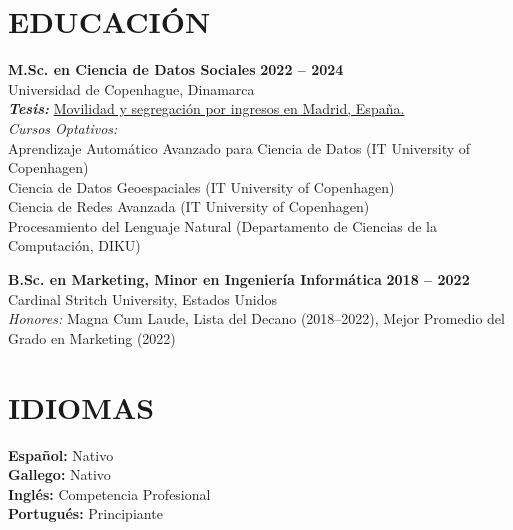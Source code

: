 \documentclass{resume}
\begin{document}
\section{EDUCACIÓN} 
\begin{content}
    {\bf M.Sc. en Ciencia de Datos Sociales} \hfill {\bf 2022 -- 2024} \\ 
    Universidad de Copenhague, Dinamarca \\ 
    {\bf \em Tesis:} {\href{https://github.com/carobs9/segregation-madrid}{Movilidad y segregación por ingresos en Madrid, España.}} \\ 
    {\em Cursos Optativos:} \\ 
    {\small
    Aprendizaje Automático Avanzado para Ciencia de Datos (IT University of Copenhagen) \\ 
    Ciencia de Datos Geoespaciales (IT University of Copenhagen) \\ 
    Ciencia de Redes Avanzada (IT University of Copenhagen) \\ 
    Procesamiento del Lenguaje Natural (Departamento de Ciencias de la Computación, DIKU) \\ 
    }

    {\bf B.Sc. en Marketing, Minor en Ingeniería Informática} \hfill {\bf 2018 -- 2022} \\ 
    Cardinal Stritch University, Estados Unidos \\ 
    {\em Honores:} Magna Cum Laude, Lista del Decano (2018--2022), Mejor Promedio del Grado en Marketing (2022)
\end{content}

\section{IDIOMAS} 
\begin{content}
    {\bf Español:} Nativo \\ 
    {\bf Gallego:} Nativo \\ 
    {\bf Inglés:} Competencia Profesional \\ 
    {\bf Portugués:} Principiante \\
\end{content}

\end{document}
